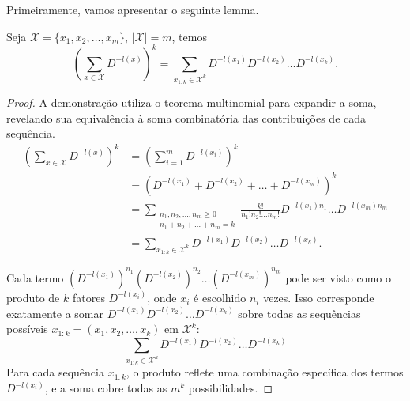 Primeiramente, vamos apresentar o seguinte lemma.
\begin{lemma}\label{lm:expmultin}
  Seja $\mathcal{X} = \{x_1, x_2, \ldots, x_m \}$, $\vert \mathcal{X} \vert = m$, temos
  \begin{equation}
    \left( \sum_{x \in \mathcal{X}} D^{-l(x)} \right)^k = \sum_{x_{1:k} \in \mathcal{X}^k} D^{-l(x_1)} D^{-l(x_2)} \ldots D^{-l(x_k)} .
  \end{equation}
\end{lemma}
\begin{proof}
  A demonstração utiliza o teorema multinomial para expandir a soma, revelando sua equivalência à soma combinatória das contribuições de cada sequência.
  \begin{subequations}
    \begin{align}
    \left( \sum_{x \in \mathcal{X}} D^{-l(x)} \right)^k &= \left( \sum_{i=1}^{m} D^{-l(x_i)} \right)^k \\
        &= \left( D^{-l(x_1)} + D^{-l(x_2)} + \ldots + D^{-l(x_m)}  \right)^k \nonumber \\
        &= \sum_{\substack{ n_1, n_2, \ldots, n_m \geq 0 \\ n_1 + n_2 + \ldots + n_m = k}} \frac{k!}{n_1! n_2! \ldots n_m!} D^{-l(x_1)n_1} \ldots D^{-l(x_m)n_m} \\
        &= \sum_{x_{1:k} \in \mathcal{X}^k} D^{-l(x_1)} D^{-l(x_2)} \ldots D^{-l(x_k)} .
    \end{align}
  \end{subequations}

  Cada termo $(D^{-l(x_1)})^{n_1} (D^{-l(x_2)})^{n_2} \ldots (D^{-l(x_m)})^{n_m}$ 
  pode ser visto como o produto de $k$ fatores $D^{-l(x_i)}$, onde $x_i$ é escolhido $n_i$ vezes. 
  Isso corresponde exatamente a somar $D^{-l(x_1)} D^{-l(x_2)} \ldots D^{-l(x_k)}$ 
  sobre todas as sequências possíveis $x_{1:k} = (x_1, x_2, \ldots, x_k)$ em $\mathcal{X}^k$:
  \[
  \sum_{x_{1:k} \in \mathcal{X}^k} D^{-l(x_1)} D^{-l(x_2)} \ldots D^{-l(x_k)}
  \]
  Para cada sequência $x_{1:k}$, o produto reflete uma combinação específica dos termos $D^{-l(x_i)}$, e a soma cobre todas as $m^k$ possibilidades.
\end{proof}



